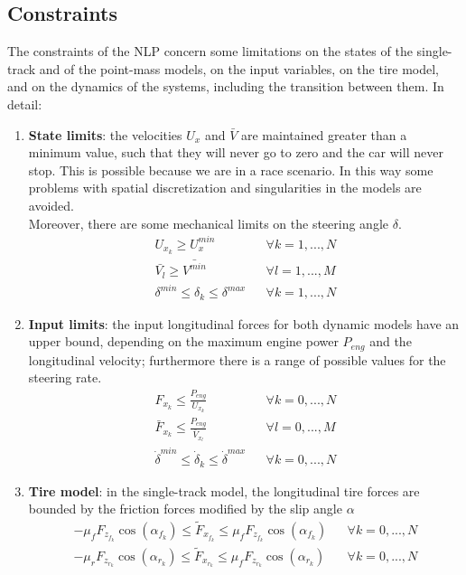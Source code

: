 \documentclass[a4paper, onecolumn, 12pt]{article}
\begin{document}
\subsection{Constraints}
The constraints of the NLP concern some limitations on the states of the single-track and of the point-mass models, 
on the input variables, on the tire model, and on the dynamics of the systems, including the transition between
them. In detail:
\begin{enumerate}
    \item \textbf{State limits}: the velocities $U_x$ and $\bar{V}$ are maintained greater than a minimum value, such 
    that they will never go to zero and the car will never stop. This is possible because we are in a race scenario.
    In this way some problems with spatial discretization and singularities in the models are avoided.\\
    Moreover, there are some mechanical limits on the steering angle $\delta$.
    \begin{align}
        U_{x_k} \geq U_x^{min} && \forall k=1,...,N\\
        \bar{V_l} \geq \bar{V^{min}} && \forall l=1,...,M\\
        \delta^{min} \leq \delta_k \leq \delta^{max} && \forall k=1,...,N
    \end{align}

    \item \textbf{Input limits}: the input longitudinal forces for both dynamic models have an upper bound, depending
    on the maximum engine power $P_{eng}$ and the longitudinal velocity; furthermore there is a range of possible values
    for the steering rate.
    \begin{align}
        F_{x_k} \leq \frac{P_{eng}}{U_{x_k}} && \forall k=0,...,N \\
        \bar{F}_{x_k} \leq \frac{P_{eng}}{\bar{V}_{x_l}} && \forall l=0,...,M \\
        \dot{\delta}^{min} \leq \dot{\delta}_{k} \leq \dot{\delta}^{max} && \forall k=0,...,N
    \end{align}

    \item \textbf{Tire model}: in the single-track model, the longitudinal tire forces are bounded by the friction forces 
    modified by the slip angle $\alpha$
    \begin{align}
        -\mu_f F_{z_{f_k}} \cos(\alpha_{f_k}) \leq \tilde{F}_{x_{f_k}} \leq \mu_f F_{z_{f_k}} \cos(\alpha_{f_k}) && \forall k=0,...,N \\
        -\mu_r F_{z_{r_k}} \cos(\alpha_{r_k}) \leq \tilde{F}_{x_{r_k}} \leq \mu_f F_{z_{r_k}} \cos(\alpha_{r_k}) && \forall k=0,...,N 
    \end{align}


\end{enumerate}
\end{document}

